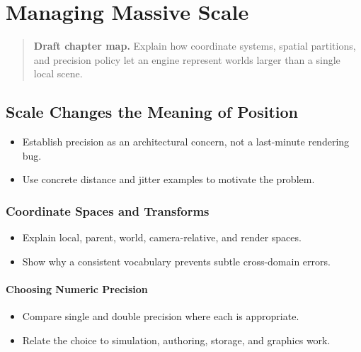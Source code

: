 \documentclass[
  11pt,
  letterpaper,
  DIV=11,
  numbers=noendperiod,
  twoside,
  open=right]{scrreprt}
\providecommand{\tightlist}{%
  \setlength{\itemsep}{0pt}\setlength{\parskip}{0pt}}
\begin{document}
\chapter{Managing Massive Scale}\label{managing-massive-scale}

\begin{quote}
\textbf{Draft chapter map.} Explain how coordinate systems, spatial
partitions, and precision policy let an engine represent worlds larger
than a single local scene.
\end{quote}

\section{Scale Changes the Meaning of
Position}\label{scale-changes-the-meaning-of-position}

\begin{itemize}
\tightlist
\item
  Establish precision as an architectural concern, not a last-minute
  rendering bug.
\item
  Use concrete distance and jitter examples to motivate the problem.
\end{itemize}

\subsection{Coordinate Spaces and
Transforms}\label{coordinate-spaces-and-transforms}

\begin{itemize}
\tightlist
\item
  Explain local, parent, world, camera-relative, and render spaces.
\item
  Show why a consistent vocabulary prevents subtle cross-domain errors.
\end{itemize}

\subsubsection{Choosing Numeric
Precision}\label{choosing-numeric-precision}

\begin{itemize}
\tightlist
\item
  Compare single and double precision where each is appropriate.
\item
  Relate the choice to simulation, authoring, storage, and graphics
  work.
\end{itemize}
\end{document}
